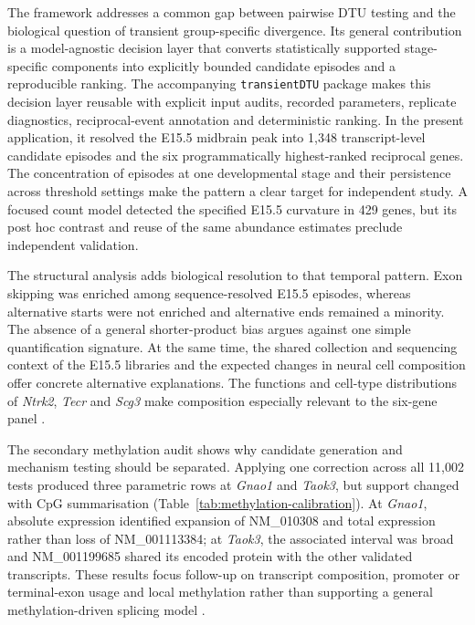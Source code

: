 \documentclass[11pt,a4paper]{article}
\begin{document}
The framework addresses a common gap between pairwise DTU testing and the biological question of transient group-specific divergence. Its general contribution is a model-agnostic decision layer that converts statistically supported stage-specific components into explicitly bounded candidate episodes and a reproducible ranking. The accompanying \texttt{transientDTU} package makes this decision layer reusable with explicit input audits, recorded parameters, replicate diagnostics, reciprocal-event annotation and deterministic ranking. In the present application, it resolved the E15.5 midbrain peak into 1,348 transcript-level candidate episodes and the six programmatically highest-ranked reciprocal genes. The concentration of episodes at one developmental stage and their persistence across threshold settings make the pattern a clear target for independent study. A focused count model detected the specified E15.5 curvature in 429 genes, but its post hoc contrast and reuse of the same abundance estimates preclude independent validation.

The structural analysis adds biological resolution to that temporal pattern. Exon skipping was enriched among sequence-resolved E15.5 episodes, whereas alternative starts were not enriched and alternative ends remained a minority. The absence of a general shorter-product bias argues against one simple quantification signature. At the same time, the shared collection and sequencing context of the E15.5 libraries and the expected changes in neural cell composition offer concrete alternative explanations. The functions and cell-type distributions of \textit{Ntrk2}, \textit{Tecr} and \textit{Scg3} make composition especially relevant to the six-gene panel \citep{holt_trkbt1_2019,wang_tecr_2022,gomi_scg3_2021}.

The secondary methylation audit shows why candidate generation and mechanism testing should be separated. Applying one correction across all 11,002 tests produced three parametric rows at \textit{Gnao1} and \textit{Taok3}, but support changed with CpG summarisation (Table~\ref{tab:methylation-calibration}). At \textit{Gnao1}, absolute expression identified expansion of NM\_010308 and total expression rather than loss of NM\_001113384; at \textit{Taok3}, the associated interval was broad and NM\_001199685 shared its encoded protein with the other validated transcripts. These results focus follow-up on transcript composition, promoter or terminal-exon usage and local methylation rather than supporting a general methylation-driven splicing model \citep{batsche2021cd44,chhatbar_mecp2_2020}.
\end{document}

